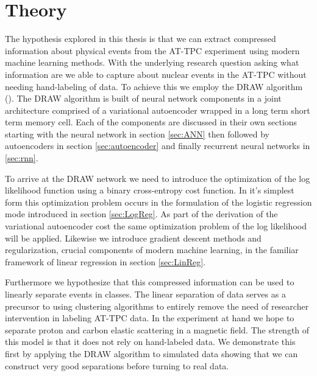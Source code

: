 \chapter{Theory}

The hypothesis explored in this thesis is that we can extract compressed information about physical events from the AT-TPC experiment using modern machine learning methods. With the underlying research question asking what information are we able to capture about nuclear events in the AT-TPC without needing hand-labeling of data. To achieve this we employ the DRAW algorithm (\cite{Gregor2015}). The DRAW algorithm is built of neural network components in a joint architecture comprised of a variational autoencoder wrapped in a long term short term memory cell. Each  of the components are discussed in their own sections starting with the neural network in  section \ref{sec:ANN} then followed by autoencoders in section \ref{sec:autoencoder} and finally recurrent neural networks in \ref{sec:rnn}. 

\noindent To arrive at the DRAW network we need to introduce the optimization of the log likelihood function using a binary cross-entropy cost function. In it's simplest form this optimization problem occurs in the formulation of the logistic regression mode introduced in section \ref{sec:LogReg}. As part of the derivation of the variational autoencoder cost the same optimization problem of the log likelihood will be applied. Likewise we introduce gradient descent methods and regularization, crucial components of modern machine learning, in the familiar framework of linear regression in section \ref{sec:LinReg}. 

\noindent Furthermore we hypothesize that this compressed information can be used to linearly separate events in classes. The linear separation of data serves as a precursor to using clustering algorithms to entirely remove the need of researcher intervention in labeling AT-TPC data. In the experiment at hand we hope to separate proton and carbon elastic scattering in a magnetic field. The strength of this model is that it does not rely on hand-labeled data. We demonstrate this first by applying the DRAW algorithm to simulated data showing that we can construct very good separations before turning to real data.

